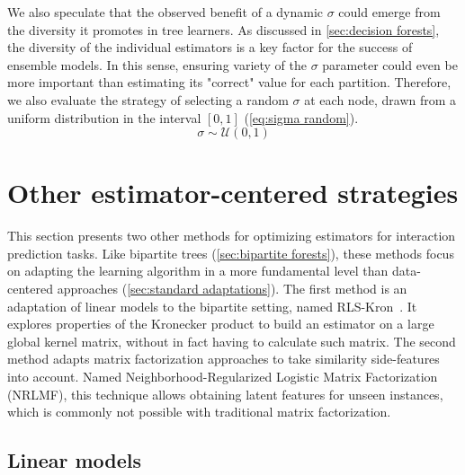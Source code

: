 We also speculate that the observed benefit of a dynamic $\sigma$ could emerge from the diversity it promotes in tree learners. As discussed in \autoref{sec:decision forests}, the diversity of the individual estimators is a key factor for the success of ensemble models. In this sense, ensuring variety of the $\sigma$ parameter could even be more important than estimating its "correct" value for each partition. Therefore, we also evaluate the strategy of selecting a random $\sigma$ at each node, drawn from a uniform distribution in the interval $[0, 1]$ (\autoref{eq:sigma random}).
%
\begin{equation}
    \sigma \sim \mathcal{U}(0, 1)
    \label{eq:sigma random}
\end{equation}



\section{Other estimator-centered strategies}
\label{sec:learner centered}

This section presents two other methods for optimizing estimators for interaction prediction tasks.
Like bipartite trees (\autoref{sec:bipartite forests}), these methods focus on adapting the learning algorithm in a more fundamental level than data-centered approaches (\autoref{sec:standard adaptations}). 
The first method is an adaptation of linear models to the bipartite setting, named RLS-Kron~\cite{vanlaarhoven2011gaussian}. It explores properties of the Kronecker product to build an estimator on a large global kernel matrix, without in fact having to calculate such matrix.
The second method adapts matrix factorization approaches to take similarity side-features into account. Named Neighborhood-Regularized Logistic Matrix Factorization (NRLMF), this technique allows obtaining latent features for unseen instances, which is commonly not possible with traditional matrix factorization.

\subsection{Linear models}
\label{sec:linear_models}

